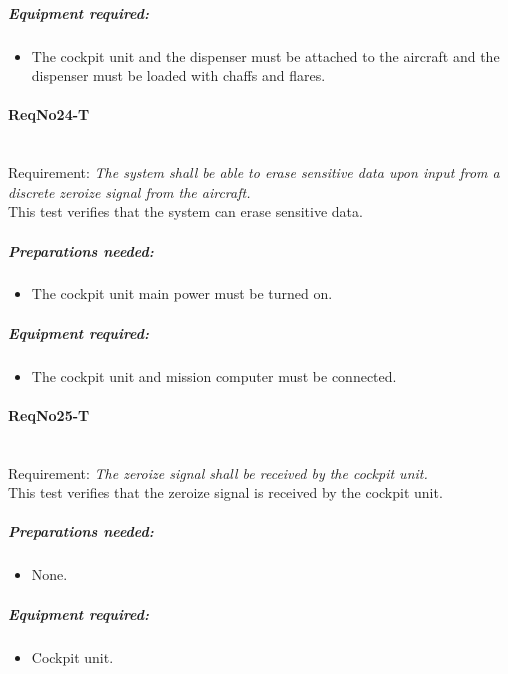	\subparagraph{Equipment required:}
	\begin{itemize}
	\item The cockpit unit and the dispenser must be attached to the aircraft and the dispenser must be loaded with chaffs and flares.
	\end{itemize}

\paragraph{ReqNo24-T}\mbox{}\\ %
Requirement: \textit{The system shall be able to erase sensitive data upon input from a discrete zeroize signal from the aircraft.}\\

This test verifies that the system can erase sensitive data.
	\subparagraph{Preparations needed:}
	\begin{itemize}
	\item The cockpit unit main power must be turned on.
	\end{itemize}

	\subparagraph{Equipment required:}
	\begin{itemize}
	\item The cockpit unit and mission computer must be connected.
	\end{itemize}

\paragraph{ReqNo25-T}\mbox{}\\ %
Requirement: \textit{The zeroize signal shall be received by the cockpit unit.}\\

This test verifies that the zeroize signal is received by the cockpit unit.
	\subparagraph{Preparations needed:}
	\begin{itemize}
	\item None.
	\end{itemize}
	
		
	\subparagraph{Equipment required:}
	\begin{itemize}
	\item Cockpit unit.
	\end{itemize}

